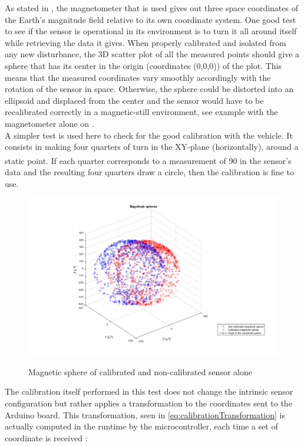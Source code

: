 As stated in , the magnetometer that is used gives out three space coordinates of the Earth's magnitude field relative to its own coordinate system. One good test to see if the sensor is operational in its environment is to turn it all around itself while retrieving the data it gives. When properly calibrated and isolated from any new disturbance, the 3D scatter plot of all the measured points should give a sphere that has its center in the origin (coordinates (0,0,0)) of the plot. This means that the measured coordinates vary smoothly accordingly with the rotation of the sensor in space. Otherwise, the sphere could be distorted into an ellipsoid and displaced from the center and the sensor would have to be recalibrated correctly in a magnetic-still environment, see example with the magnetometer alone on .\\
A simpler test is used here to check for the good calibration with the vehicle. It consists in making four quarters of turn in the XY-plane (horizontally), around a static point. If each quarter corresponds to a measurement of \si{90^{\circ}} in the sensor's data and the resulting four quarters draw a circle, then the calibration is fine to use.
\begin{figure}[H]
    \centering
  {
    \includegraphics[width=1.2\textwidth]{figures/spheresMagnitude.png}
  }
  \caption{Magnetic sphere of calibrated and non-calibrated sensor alone}
  \label{fig:calibrationTestSpheres}
\end{figure}
%
The calibration itself performed in this test does not change the intrinsic sensor configuration but rather applies a transformation to the coordinates sent to the Arduino board. This transformation, seen in \eqref{eq:calibrationTransformation} is actually computed in the runtime by the microcontroller, each time a set of coordinate is received :
